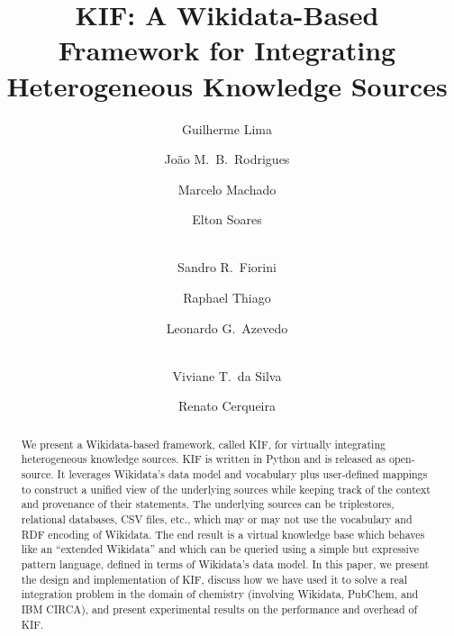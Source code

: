 \documentclass[runningheads]{llncs}
\begin{document}
\title{KIF\@: A Wikidata-Based Framework for
  Integrating Heterogeneous Knowledge Sources}

\author{
  Guilherme Lima
  \and
  João M.~B.~Rodrigues
  \and
  Marcelo Machado
  \and
  Elton Soares
  \and\\
  Sandro R.~Fiorini
  \and
  Raphael Thiago
  \and
  Leonardo G.~Azevedo
  \and\\
  Viviane T.~da Silva
  \and
  Renato Cerqueira}



\maketitle

\begin{abstract}
  We present a Wikidata-based framework, called KIF, for virtually integrating heterogeneous knowledge sources.
  KIF is written in Python and is released as open-source.
  It leverages Wikidata's data model and vocabulary plus user-defined mappings to construct a unified view of the underlying sources while keeping track of the context and provenance of their statements.
  The underlying sources can be triplestores, relational databases, CSV files, etc., which may or may not use the vocabulary and RDF encoding of Wikidata.
  The end result is a virtual knowledge base which behaves like an ``extended Wikidata'' and which can be queried using a simple but expressive pattern language, defined in terms of Wikidata's data model.
  In this paper, we present the design and implementation of KIF, discuss how we have used it to solve a real integration problem in the domain of chemistry (involving Wikidata, PubChem, and IBM CIRCA), and present experimental results on the performance and overhead of KIF\@.

\end{abstract}










\end{document}
